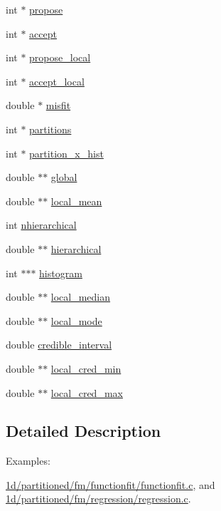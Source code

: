 \begin{DoxyCompactItemize}
\item 
int $\ast$ \hyperlink{struct__resultset1dfm_a1caf2d73d2edbdcaae8588a8a61447a9}{propose}
\item 
int $\ast$ \hyperlink{struct__resultset1dfm_a7afcfc316c2b6634844c1467b1417b97}{accept}
\item 
int $\ast$ \hyperlink{struct__resultset1dfm_a3f6c790571a841a65e43b825be59b958}{propose\+\_\+local}
\item 
int $\ast$ \hyperlink{struct__resultset1dfm_ae4760c6b41373090251048f441c602f7}{accept\+\_\+local}
\item 
double $\ast$ \hyperlink{struct__resultset1dfm_af30e93b1c8aeefcf1af09d032f0ff61e}{misfit}
\item 
int $\ast$ \hyperlink{struct__resultset1dfm_a90991b169a7704488c71cb36047260b9}{partitions}
\item 
int $\ast$ \hyperlink{struct__resultset1dfm_aff0d258369cc09d605b366d220bff236}{partition\+\_\+x\+\_\+hist}
\item 
double $\ast$$\ast$ \hyperlink{struct__resultset1dfm_a0e078ab646d4c91612604d3fdd2dba92}{global}
\item 
double $\ast$$\ast$ \hyperlink{struct__resultset1dfm_adb8f083b8d35b6edb2193e2dec73bac3}{local\+\_\+mean}
\item 
int \hyperlink{struct__resultset1dfm_a263def7ce34e2c3d9cd0a50ad0c9b067}{nhierarchical}
\item 
double $\ast$$\ast$ \hyperlink{struct__resultset1dfm_a0623b9e2d931dd305e86cb3580867143}{hierarchical}
\item 
int $\ast$$\ast$$\ast$ \hyperlink{struct__resultset1dfm_a14bbf9b5794558c13c2a3ba55304947a}{histogram}
\item 
double $\ast$$\ast$ \hyperlink{struct__resultset1dfm_aeb9c76e57ac7f44fb7a10777b418359f}{local\+\_\+median}
\item 
double $\ast$$\ast$ \hyperlink{struct__resultset1dfm_a9f756b2dcafab255fcd1cd2180d167af}{local\+\_\+mode}
\item 
double \hyperlink{struct__resultset1dfm_a0680986edd1f0b2afb06b6f02d68e736}{credible\+\_\+interval}
\item 
double $\ast$$\ast$ \hyperlink{struct__resultset1dfm_acb42fb536fad644f52fa1fe83ca503d3}{local\+\_\+cred\+\_\+min}
\item 
double $\ast$$\ast$ \hyperlink{struct__resultset1dfm_af48b2482fb58423ec1caeb2a94796e08}{local\+\_\+cred\+\_\+max}
\end{DoxyCompactItemize}


\subsection{Detailed Description}
\begin{Desc}
\item[Examples\+: ]\par
\hyperlink{1d_2partitioned_2fm_2functionfit_2functionfit_8c-example}{1d/partitioned/fm/functionfit/functionfit.\+c}, and \hyperlink{1d_2partitioned_2fm_2regression_2regression_8c-example}{1d/partitioned/fm/regression/regression.\+c}.\end{Desc}


